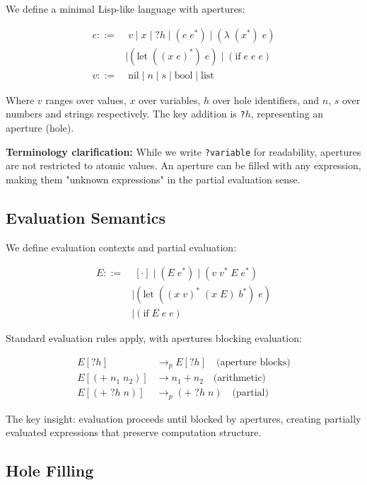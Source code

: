 \documentclass[10pt]{article}
\begin{document}
We define a minimal Lisp-like language with apertures:

\begin{align}
e ::= &\; v \mid x \mid \texttt{?}h \mid (e \; e^*) \mid (\lambda \; (x^*) \; e) \\
    &\mid (\text{let} \; ((x \; e)^*) \; e) \mid (\text{if} \; e \; e \; e) \\
v ::= &\; \text{nil} \mid n \mid s \mid \text{bool} \mid \text{list}
\end{align}

Where $v$ ranges over values, $x$ over variables, $h$ over hole identifiers, and $n$, $s$ over numbers and strings respectively. The key addition is \texttt{?}$h$, representing an aperture (hole).

\textbf{Terminology clarification:} While we write \texttt{?variable} for readability, apertures are not restricted to atomic values. An aperture can be filled with any expression, making them "unknown expressions" in the partial evaluation sense.

\subsection{Evaluation Semantics}

We define evaluation contexts and partial evaluation:

\begin{align}
E ::= &\; [\cdot] \mid (E \; e^*) \mid (v \; v^* \; E \; e^*) \\
     &\mid (\text{let} \; ((x \; v)^* \; (x \; E) \; b^*) \; e) \\
     &\mid (\text{if} \; E \; e \; e)
\end{align}

Standard evaluation rules apply, with apertures blocking evaluation:

\begin{align}
E[\texttt{?}h] &\rightarrow_p E[\texttt{?}h] \quad \text{(aperture blocks)} \\
E[(+ \; n_1 \; n_2)] &\rightarrow n_1 + n_2 \quad \text{(arithmetic)} \\
E[(+ \; \texttt{?}h \; n)] &\rightarrow_p (+ \; \texttt{?}h \; n) \quad \text{(partial)}
\end{align}

The key insight: evaluation proceeds until blocked by apertures, creating partially evaluated expressions that preserve computation structure.

\subsection{Hole Filling}
\end{document}
